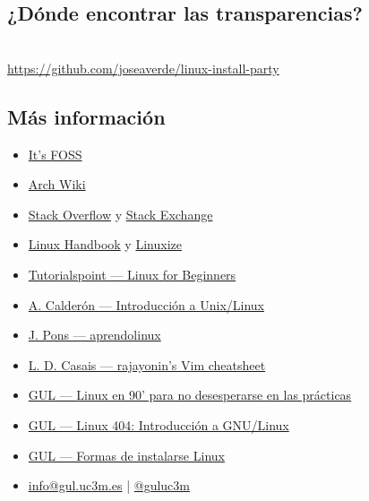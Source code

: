 \documentclass[aspectratio=43]{beamer}
\begin{document}
    \subsection{¿Dónde encontrar las transparencias?}
    \begin{frame}[plain]{\subsecname}
        \centering{}
        \hphantom{}\\
        \url{https://github.com/joseaverde/linux-install-party}
    \end{frame}
    \subsection{Más información}
    \begin{frame}{\secname}{\subsecname}
        \begin{itemize}
            \item \href{https://itsfoss.com/}{It's FOSS}
            \item \href{https://wiki.archlinux.org/}{Arch Wiki}
            \item \href{https://stackoverflow.com/}{Stack Overflow} y \href{https://stackoverflow.com/}{Stack Exchange}
            \item \href{https://stackoverflow.com/}{Linux Handbook} y \href{https://linuxize.com/}{Linuxize}
            \item \href{https://www.tutorialspoint.com/unix/index.htm}{Tutorialspoint — Linux for Beginners}
            \item \href{https://github.com/acaldero/uc3m_linux}{A. Calderón — Introducción a Unix/Linux}
            \item \href{https://aprendolinux.com}{J. Pons — aprendolinux}
            \item \href{https://github.com/rajayonin/cheatsheets/blob/main/vim_cheatsheet.md}{L. D. Casais — rajayonin's Vim cheatsheet}
            \item \href{https://youtu.be/2qZBUa93MQ8}{GUL — Linux en 90' para no desesperarse en las prácticas}
            \item \href{https://cloud-gul.uc3m.es/s/4qXKozr7DmDSZiN}{GUL — Linux 404: Introducción a GNU/Linux}
            \item \href{https://github.com/guluc3m/linux404/blob/main/README.md}{GUL — Formas de instalarse Linux}
            \item \href{mailto:info@gul.uc3m.es}{info@gul.uc3m.es} | \href{https://twitter.com/guluc3m}{@guluc3m}
        \end{itemize}
    \end{frame}
\end{document}
